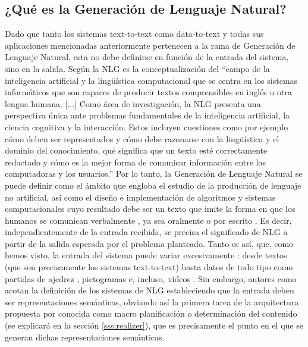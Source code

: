 \subsection{¿Qué es la Generación de Lenguaje Natural?}\label{ss:quenlg}
Dado que tanto los sistemas text-to-text como data-to-text y todas sus aplicaciones mencionadas anteriormente pertenecen a la rama de Generación de Lenguaje Natural, esta no debe definirse en función de la entrada del sistema, sino en la salida. Según \cite{biblia} la NLG es la conceptualización del ``campo de la inteligencia artificial y la lingüística computacional que se centra en los sistemas informáticos que son capaces de producir textos comprensibles en inglés u otra lengua humana. [...] Como área de investigación, la NLG presenta una perspectiva única ante problemas fundamentales de la inteligencia artificial, la ciencia cognitiva y la interacción. Estos incluyen cuestiones como por ejemplo cómo deben ser representados y cómo debe razonarse con la lingüística y el dominio del conocimiento, qué significa que un texto esté correctamente redactado y cómo es la mejor forma de comunicar información entre las computadoras y los usuarios.'' Por lo tanto, la Generación de Lenguaje Natural se puede definir como el ámbito que engloba el estudio de la producción de lenguaje no artificial, así como el diseño e implementación de algoritmos y sistemas computacionales cuyo resultado debe ser un texto que imite la forma en que los humanos se comunican verbalmente \citep{vicente2015generacion}, ya sea oralmente o por escrito \citep{del2007que}. Es decir, independientemente de la entrada recibida, se precisa el significado de NLG a partir de la salida esperada por el problema planteado. Tanto es así, que, como hemos visto, la entrada del sistema puede variar excesivamente \citep{mcdonald1993issues}: desde textos (que son precisamente los sistemas text-to-text) hasta datos de todo tipo como partidas de ajedrez \citep{gervas2014composing}, pictogramas \citep{gonzalez2019traductor} e, incluso, vídeos \citep{thomason2014integrating}. Sin embargo, autores como \cite{duvsek2020evaluating} acotan la definición de los sistemas de NLG estableciendo que la entrada deben ser representaciones semánticas, obviando así la primera tarea de la arquitectura propuesta por \cite{biblia} conocida como macro planificación o determinación del contenido (se explicará en la sección \ref{sss:realizer}), que es precisamente el punto en el que se generan dichas representaciones semánticas.

